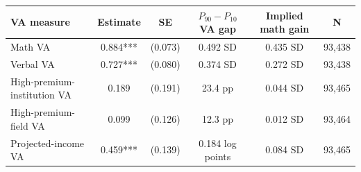 \begin{tabular}{lccccc}
\toprule
VA measure & Estimate & SE & $P_{90}-P_{10}$ VA gap & Implied math gain & N \\
\midrule
Math VA & 0.884*** & (0.073) & 0.492 SD & 0.435 SD & 93,438 \\
Verbal VA & 0.727*** & (0.080) & 0.374 SD & 0.272 SD & 93,438 \\
High-premium-institution VA & 0.189 & (0.191) & 23.4 pp & 0.044 SD & 93,465 \\
High-premium-field VA & 0.099 & (0.126) & 12.3 pp & 0.012 SD & 93,464 \\
Projected-income VA & 0.459*** & (0.139) & 0.184 log points & 0.084 SD & 93,465 \\
\bottomrule
\end{tabular}
